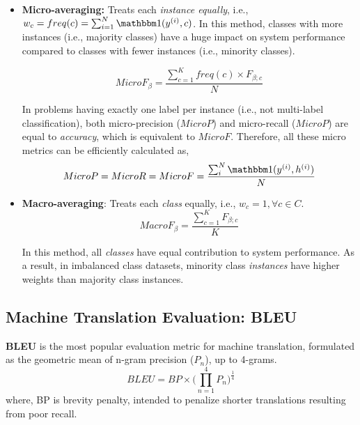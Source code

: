 \begin{itemize}
\item \textbf{Micro-averaging:} Treats each \textit{instance equally}, i.e., $w_c = freq(c) = \sum_{i=1}^N \ind{y^{(i)}, c}$. 
In this method, classes with more instances (i.e., majority classes) have a huge impact on system performance compared to classes with fewer instances (i.e., minority classes).

\begin{equation}\label{eq:microf}
  MicroF_\beta = \frac{\sum_{c=1}^K freq(c) \times F_{\beta;c}}{N}  
\end{equation}

In problems having exactly one label per instance (i.e., not multi-label classification), both micro-precision ($MicroP$) and micro-recall ($MicroP$) are equal to \textit{accuracy}, which is equivalent to $MicroF$. 
Therefore, all these micro metrics can be efficiently calculated as,
\begin{equation}\label{eq:microf-simple}
   MicroP = MicroR = MicroF = \frac{\sum_i^N \ind{y^{(i)}, h^{(i)}}}{N} 
\end{equation}

\item \textbf{Macro-averaging}: Treats each \textit{class} equally, i.e., $w_c=1, \forall c \in C$. 
\begin{equation}\label{eq:macrof}
  MacroF_\beta = \frac{\sum_{c=1}^K F_{\beta;c}}{K}  
\end{equation}


In this method, all \textit{classes} have equal contribution to system performance. 
As a result, in imbalanced class datasets, minority class \textit{instances} have higher weights than majority class instances. 
\end{itemize}


\subsection{Machine Translation Evaluation: BLEU}

\textbf{BLEU} \cite{papineni-etal-2002-bleu} is the most popular evaluation metric for machine translation, formulated as the geometric mean of n-gram precision ($P_n$), up to 4-grams. 
  $$ BLEU = BP \times \Big(\prod_{n=1}^4 P_n \Big)^\frac{1}{4}$$
where, BP is brevity penalty, intended to penalize shorter translations resulting from poor recall.


